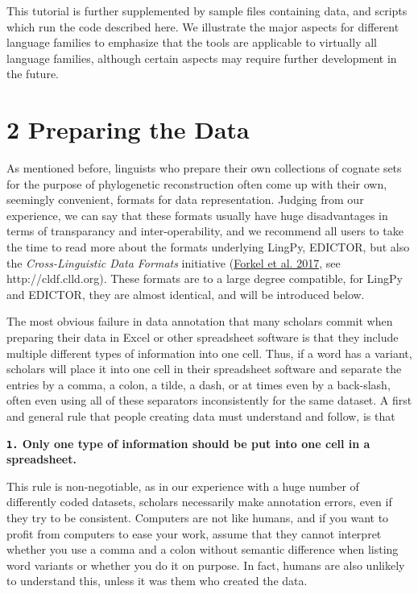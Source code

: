 \documentclass[a4paper,svgnames]{scrartcl}
\begin{document}
This tutorial is further supplemented by sample files containing data,
and scripts which run the code described here. We illustrate the major
aspects for different language families to emphasize that the tools are
applicable to virtually all language families, although certain aspects
may require further development in the future.

\section*{2 Preparing the Data}\label{preparing-the-data}

As mentioned before, linguists who prepare their own collections of
cognate sets for the purpose of phylogenetic reconstruction often come
up with their own, seemingly convenient, formats for data
representation. Judging from our experience, we can say that these
formats usually have huge disadvantages in terms of transparancy and
inter-operability, and we recommend all users to take the time to read
more about the formats underlying LingPy, EDICTOR, but also the
\emph{Cross-Linguistic Data Formats} initiative
(\href{http://bibliography.lingpy.org?key=Forkel2017a}{Forkel et al.
2017}, see http://cldf.clld.org). These formats are to a large degree
compatible, for LingPy and EDICTOR, they are almost identical, and will
be introduced below.

The most obvious failure in data annotation that many scholars commit
when preparing their data in Excel or other spreadsheet software is that
they include multiple different types of information into one cell.
Thus, if a word has a variant, scholars will place it into one cell in
their spreadsheet software and separate the entries by a comma, a colon,
a tilde, a dash, or at times even by a back-slash, often even using all
of these separators inconsistently for the same dataset. A first and
general rule that people creating data must understand and follow, is
that

\textbf{\texttt{1.} Only one type of information should be put into one
cell in a spreadsheet.}

This rule is non-negotiable, as in our experience with a huge number of
differently coded datasets, scholars necessarily make annotation errors,
even if they try to be consistent. Computers are not like humans, and if
you want to profit from computers to ease your work, assume that they
cannot interpret whether you use a comma and a colon without semantic
difference when listing word variants or whether you do it on purpose.
In fact, humans are also unlikely to understand this, unless it was them
who created the data.
\end{document}
